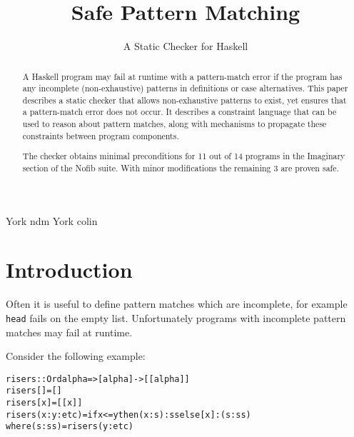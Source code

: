 \documentclass[preprint]{sigplanconf}
\newcommand{\T}[1]{\texttt{#1}}
\newenvironment{code}{\begin{alltt}\small}{\end{alltt}}
\begin{document}
\copyrightdata{[to be supplied]}

\titlebanner{\today{} - \currenttime{}}        %
\preprintfooter{}   %

\title{Safe Pattern Matching}
\subtitle{A Static Checker for Haskell}

           {York}
           {ndm}
           {York}
           {colin}

\maketitle

\begin{abstract}
A Haskell program may fail at runtime with a pattern-match error if the program has any incomplete (non-exhaustive) patterns in definitions or case alternatives. This paper describes a static checker that allows non-exhaustive patterns to exist, yet ensures that a pattern-match error does not occur. It describes a constraint language that can be used to reason about pattern matches, along with mechanisms to propagate these constraints between program components.

The checker obtains minimal preconditions for 11 out of 14 programs in the Imaginary section of the Nofib suite\citep{nofib}. With minor modifications the remaining 3 are proven safe.
\end{abstract}




\section{Introduction}
\label{sec:introduction}

Often it is useful to define pattern matches which are incomplete, for example \T{head} fails on the empty list. Unfortunately programs with incomplete pattern matches may fail at runtime.

Consider the following example:

\begin{code}
risers :: Ord alpha => [alpha] -> [[alpha]]
risers [] = []
risers [x] = [[x]]
risers (x:y:etc) = if x <= y then (x:s):ss else [x]:(s:ss)
    where (s:ss) = risers (y:etc)
\end{code}
\end{document}
